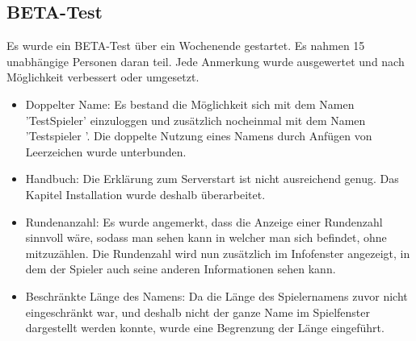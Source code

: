 \documentclass[a4paper]{article}
\begin{document}
	\subsection{BETA-Test}
	Es wurde ein BETA-Test über ein Wochenende gestartet. Es nahmen 15 unabhängige Personen daran teil.
	Jede Anmerkung wurde ausgewertet und nach Möglichkeit verbessert oder umgesetzt.
	\begin{itemize}
	\item Doppelter Name: Es bestand die Möglichkeit sich mit dem Namen 'TestSpieler' einzuloggen und zusätzlich nocheinmal 		mit dem Namen 'Testspieler '. Die doppelte Nutzung eines Namens durch Anfügen von Leerzeichen wurde unterbunden.
	\item Handbuch: Die Erklärung zum Serverstart ist nicht ausreichend genug. Das Kapitel Installation wurde deshalb 			überarbeitet.
	\item Rundenanzahl: Es wurde angemerkt, dass die Anzeige einer Rundenzahl sinnvoll wäre, sodass man sehen kann in 			welcher man sich befindet, ohne mitzuzählen. Die Rundenzahl wird nun zusätzlich im Infofenster angezeigt, in dem der			Spieler auch seine anderen Informationen sehen kann.
	\item Beschränkte Länge des Namens: Da die Länge des Spielernamens zuvor nicht eingeschränkt war, und deshalb nicht 		der ganze Name im Spielfenster dargestellt werden konnte, wurde eine Begrenzung der Länge eingeführt.
	\end{itemize}
\end{document}
